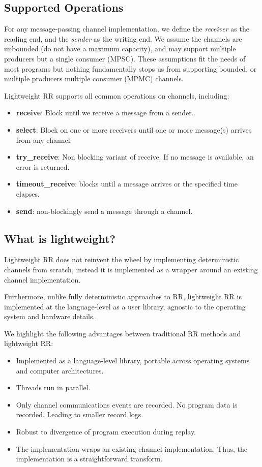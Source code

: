 \subsection{Supported Operations}
For any message-passing channel implementation, we define the \textit{receiver} as the reading end, and the \textit{sender} as the writing end. We assume the channels are unbounded (do not have a maximum capacity), and may support multiple producers but a single consumer (MPSC). These assumptions fit the needs of most programs but nothing fundamentally stops us from supporting bounded, or multiple producers multiple consumer (MPMC) channels.

Lightweight RR supports all common operations on channels, including:
\begin{itemize}
\item  \textbf{receive}: Block until we receive a message from a sender.
\item  \textbf{select}: Block on one or more receivers until one or more message(s) arrives from any channel.
\item  \textbf{try\_receive}: Non blocking variant of receive. If no message is available, an
  error is returned.
\item  \textbf{timeout\_receive}: blocks until a message arrives or the specified time elapses.
\item  \textbf{send}: non-blockingly send a message through a channel.
\end{itemize}

\subsection{What is lightweight?}
Lightweight RR does not reinvent the wheel by implementing deterministic channels from
scratch, instead it is implemented as a wrapper around an existing channel
implementation.

Furthermore, unlike fully deterministic approaches to RR, lightweight RR is
implemented at the language-level as a user library, agnostic to the operating system and
hardware details.

We highlight the following advantages between traditional RR methods and lightweight RR:
\begin{itemize}
\item Implemented as a language-level library, portable across operating systems and
  computer architectures.
\item Threads run in parallel.
\item Only channel communications events are recorded. No program data is recorded.
  Leading to smaller record logs.
\item Robust to divergence of program execution during replay.
\item The implementation wraps an existing channel implementation. Thus, the
  implementation is a straightforward transform.
\end{itemize}

